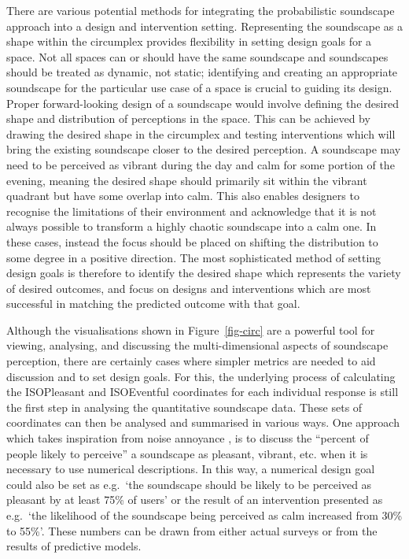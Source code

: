 \documentclass[
  authoryear,
  preprint,
  3p]{elsarticle}
\begin{document}
There are various potential methods for integrating the probabilistic
soundscape approach into a design and intervention setting. Representing
the soundscape as a shape within the circumplex provides flexibility in
setting design goals for a space. Not all spaces can or should have the
same soundscape and soundscapes should be treated as dynamic, not
static; identifying and creating an appropriate soundscape for the
particular use case of a space is crucial to guiding its design. Proper
forward-looking design of a soundscape would involve defining the
desired shape and distribution of perceptions in the space. This can be
achieved by drawing the desired shape in the circumplex and testing
interventions which will bring the existing soundscape closer to the
desired perception. A soundscape may need to be perceived as vibrant
during the day and calm for some portion of the evening, meaning the
desired shape should primarily sit within the vibrant quadrant but have
some overlap into calm. This also enables designers to recognise the
limitations of their environment and acknowledge that it is not always
possible to transform a highly chaotic soundscape into a calm one. In
these cases, instead the focus should be placed on shifting the
distribution to some degree in a positive direction. The most
sophisticated method of setting design goals is therefore to identify
the desired shape which represents the variety of desired outcomes, and
focus on designs and interventions which are most successful in matching
the predicted outcome with that goal.

Although the visualisations shown in Figure~\ref{fig-circ} are a
powerful tool for viewing, analysing, and discussing the
multi-dimensional aspects of soundscape perception, there are certainly
cases where simpler metrics are needed to aid discussion and to set
design goals. For this, the underlying process of calculating the
ISOPleasant and ISOEventful coordinates for each individual response is
still the first step in analysing the quantitative soundscape data.
These sets of coordinates can then be analysed and summarised in various
ways. One approach which takes inspiration from noise annoyance
\citep{ISO15666}, is to discuss the ``percent of people likely to
perceive'' a soundscape as pleasant, vibrant, etc. when it is necessary
to use numerical descriptions. In this way, a numerical design goal
could also be set as e.g.~`the soundscape should be likely to be
perceived as pleasant by at least 75\% of users' or the result of an
intervention presented as e.g.~`the likelihood of the soundscape being
perceived as calm increased from 30\% to 55\%'. These numbers can be
drawn from either actual surveys or from the results of predictive
models.
\end{document}
